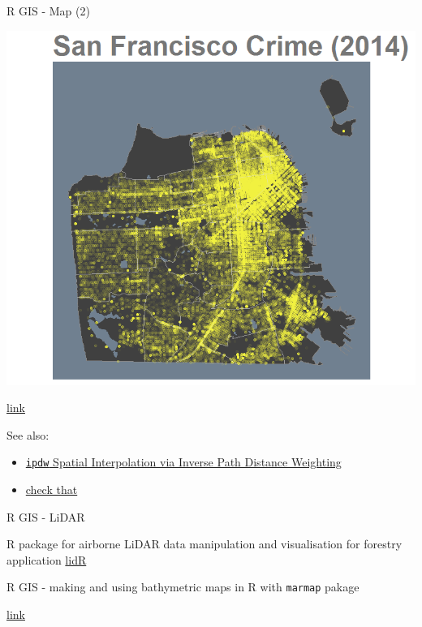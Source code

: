 \documentclass[8pt,ignorenonframetext,]{beamer}
\providecommand{\tightlist}{%
  \setlength{\itemsep}{0pt}\setlength{\parskip}{0pt}}
\begin{document}
\begin{frame}[fragile]{R GIS - Map (2)}

\includegraphics{imgPres/map_SF_Crime2014.png}

\href{http://sharpsightlabs.com/blog/mapping-san-francisco-crime/}{link}

See also:

\begin{itemize}
\tightlist
\item
  \href{https://cran.r-project.org/web/packages/ipdw/vignettes/ipdw2.html}{\texttt{ipdw}
  Spatial Interpolation via Inverse Path Distance Weighting}
\item
  \href{https://mgimond.github.io/Spatial/interpolation-in-r.html}{check
  that}
\end{itemize}

\end{frame}

\begin{frame}{R GIS - LiDAR}

R package for airborne LiDAR data manipulation and visualisation for
forestry application \href{https://github.com/Jean-Romain/lidR}{lidR}

\end{frame}

\begin{frame}{R GIS - making and using bathymetric maps in R with
\texttt{marmap} pakage}

\href{https://www.ncbi.nlm.nih.gov/pmc/articles/PMC3760912/}{link}

\end{frame}
\end{document}
